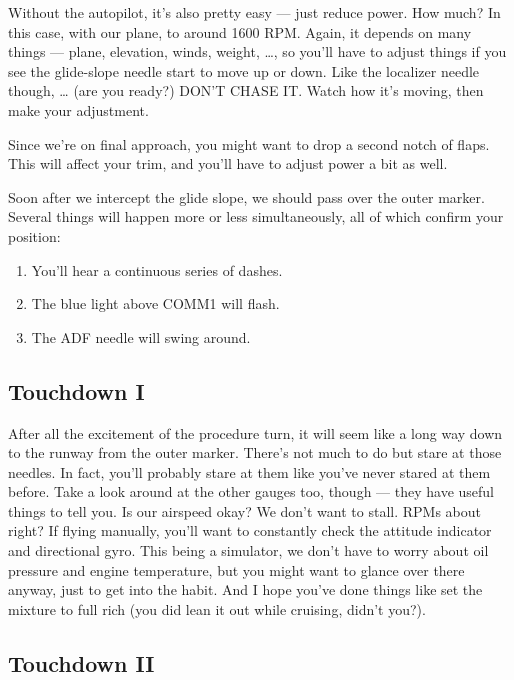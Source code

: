 Without the autopilot, it's also pretty easy --- just reduce power.
How much?  In this case, with our plane, to around 1600 RPM.  Again,
it depends on many things --- plane, elevation, winds, weight,
\ldots{}, so you'll have to adjust things if you see the glide-slope
needle start to move up or down.  Like the localizer needle though,
\ldots{} (are you ready?)  DON'T CHASE IT.  Watch how it's moving,
then make your adjustment.

Since we're on final approach, you might want to drop a second notch
of flaps.  This will affect your trim, and you'll have to adjust power
a bit as well.

Soon after we intercept the glide slope, we should pass over the outer
marker.  Several things will happen more or less simultaneously, all
of which confirm your position:

\begin{enumerate}
\item You'll hear a continuous series of dashes.
\item The blue light above COMM1 will flash.
\item The ADF needle will swing around.
\end{enumerate}

\subsection{Touchdown I}

After all the excitement of the procedure turn, it will seem like a
long way down to the runway from the outer marker.  There's not much
to do but stare at those needles.  In fact, you'll probably stare at
them like you've never stared at them before.  Take a look around at
the other gauges too, though --- they have useful things to tell you.
Is our airspeed okay?  We don't want to stall.  RPMs about right?  If
flying manually, you'll want to constantly check the attitude
indicator and directional gyro.  This being a simulator, we don't have
to worry about oil pressure and engine temperature, but you might want
to glance over there anyway, just to get into the habit.  And I hope
you've done things like set the mixture to full rich (you did lean it
out while cruising, didn't you?).

\subsection{Touchdown II}


